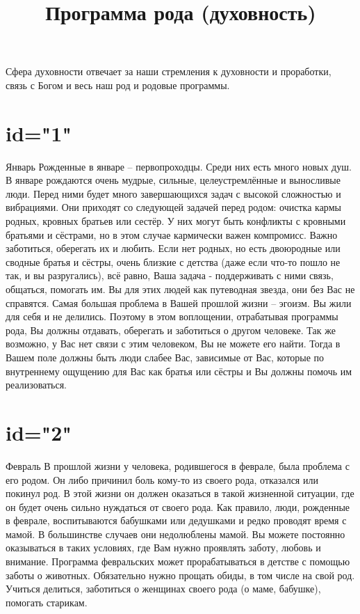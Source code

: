 \title{Программа рода (духовность)}

\description
Сфера духовности отвечает за наши стремления к духовности и проработки, 
связь с Богом и весь наш род и родовые программы.
\enddescription

\section{id="1"}{Январь}
Рожденные в январе – первопроходцы. Среди них есть много новых душ. 
В январе рождаются очень мудрые, сильные, целеустремлённые и выносливые 
люди. Перед ними будет много завершающихся задач с высокой сложностью 
и вибрациями.
Они приходят со следующей задачей перед родом: очистка кармы родных, 
кровных братьев или сестёр. У них могут быть конфликты с кровными 
братьями и сёстрами, но в этом случае кармически важен компромисс.
Важно заботиться, оберегать их и любить. Если нет родных, но есть 
двоюродные или сводные братья и сёстры, очень близкие с детства 
(даже если что-то пошло не так, и вы разругались), всё равно, 
Ваша задача - поддерживать с ними связь, общаться, помогать им. 
Вы для этих людей как путеводная звезда, они без Вас не справятся.
Самая большая проблема в Вашей прошлой жизни – эгоизм. Вы жили для 
себя и не делились. Поэтому в этом воплощении, отрабатывая программы 
рода, Вы должны отдавать, оберегать и заботиться о другом человеке. 
Так же возможно, у Вас нет связи с этим человеком, Вы не можете его 
найти. Тогда в Вашем поле должны быть люди слабее Вас, зависимые от 
Вас, которые по внутреннему ощущению для Вас как братья или сёстры 
и Вы должны помочь им реализоваться.
\endsection

\section{id="2"}{Февраль}
В прошлой жизни у человека, родившегося в феврале, была проблема 
с его родом. Он либо причинил боль кому-то из своего рода, отказался 
или покинул род. В этой жизни он должен оказаться в такой жизненной 
ситуации, где он будет очень сильно нуждаться от своего рода. 
Как правило, люди, рожденные в феврале, воспитываются бабушками 
или дедушками и редко проводят время с мамой. В большинстве случаев 
они недолюблены мамой. Вы можете постоянно оказываться в таких 
условиях, где Вам нужно проявлять заботу, любовь и внимание.
Программа февральских может прорабатываться в детстве с помощью 
заботы о животных.
Обязательно нужно прощать обиды, в том числе на свой род.
Учиться делиться, заботиться о женщинах своего рода (о маме, бабушке), 
помогать старикам.
\endsection

